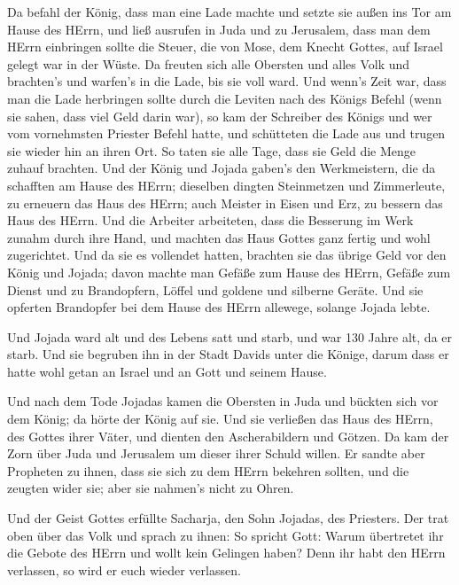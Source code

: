  Da befahl der König, dass man eine Lade machte und setzte
sie außen ins Tor am Hause des HErrn,  und ließ ausrufen in
Juda und zu Jerusalem, dass man dem HErrn einbringen sollte die Steuer,
die von Mose, dem Knecht Gottes, auf Israel gelegt war in der Wüste.
 Da freuten sich alle Obersten und alles Volk und
brachten's und warfen's in die Lade, bis sie voll ward. 
Und wenn's Zeit war, dass man die Lade herbringen sollte durch die
Leviten nach des Königs Befehl (wenn sie sahen, dass viel Geld darin
war), so kam der Schreiber des Königs und wer vom vornehmsten Priester
Befehl hatte, und schütteten die Lade aus und trugen sie wieder hin an
ihren Ort. So taten sie alle Tage, dass sie Geld die Menge zuhauf
brachten.  Und der König und Jojada gaben's den
Werkmeistern, die da schafften am Hause des HErrn; dieselben dingten
Steinmetzen und Zimmerleute, zu erneuern das Haus des HErrn; auch
Meister in Eisen und Erz, zu bessern das Haus des HErrn. 
Und die Arbeiter arbeiteten, dass die Besserung im Werk zunahm durch
ihre Hand, und machten das Haus Gottes ganz fertig und wohl zugerichtet.
 Und da sie es vollendet hatten, brachten sie das übrige
Geld vor den König und Jojada; davon machte man Gefäße zum Hause des
HErrn, Gefäße zum Dienst und zu Brandopfern, Löffel und goldene und
silberne Geräte. Und sie opferten Brandopfer bei dem Hause des HErrn
allewege, solange Jojada lebte.

 Und Jojada ward alt und des Lebens satt und starb, und war
130 Jahre alt, da er starb.  Und sie begruben ihn in der
Stadt Davids unter die Könige, darum dass er hatte wohl getan an Israel
und an Gott und seinem Hause.

 Und nach dem Tode Jojadas kamen die Obersten in Juda und
bückten sich vor dem König; da hörte der König auf sie. 
Und sie verließen das Haus des HErrn, des Gottes ihrer Väter, und
dienten den Ascherabildern und Götzen. Da kam der Zorn über Juda und
Jerusalem um dieser ihrer Schuld willen.  Er sandte aber
Propheten zu ihnen, dass sie sich zu dem HErrn bekehren sollten, und die
zeugten wider sie; aber sie nahmen's nicht zu Ohren.

 Und der Geist Gottes erfüllte Sacharja, den Sohn Jojadas,
des Priesters. Der trat oben über das Volk und sprach zu ihnen: So
spricht Gott: Warum übertretet ihr die Gebote des HErrn und wollt kein
Gelingen haben? Denn ihr habt den HErrn verlassen, so wird er euch
wieder verlassen.

